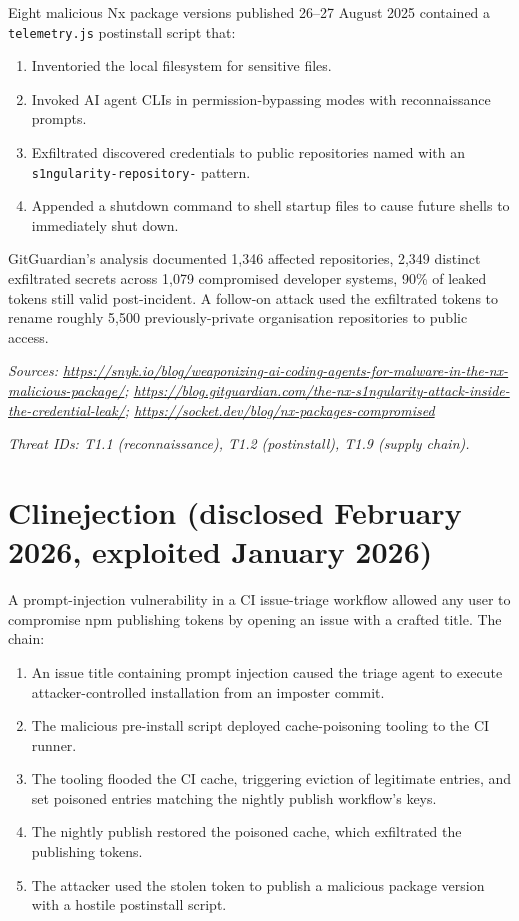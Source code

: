 Eight malicious Nx package versions published 26--27 August 2025
contained a \texttt{telemetry.js} postinstall script that:

\begin{enumerate}
\def\labelenumi{\arabic{enumi}.}
\tightlist
\item
  Inventoried the local filesystem for sensitive files.
\item
  Invoked AI agent CLIs in permission-bypassing modes with
  reconnaissance prompts.
\item
  Exfiltrated discovered credentials to public repositories named with
  an \texttt{s1ngularity-repository-} pattern.
\item
  Appended a shutdown command to shell startup files to cause future
  shells to immediately shut down.
\end{enumerate}

GitGuardian's analysis documented 1,346 affected repositories, 2,349
distinct exfiltrated secrets across 1,079 compromised developer systems,
90\% of leaked tokens still valid post-incident. A follow-on attack used
the exfiltrated tokens to rename roughly 5,500 previously-private
organisation repositories to public access.

\emph{Sources:
\url{https://snyk.io/blog/weaponizing-ai-coding-agents-for-malware-in-the-nx-malicious-package/};
\url{https://blog.gitguardian.com/the-nx-s1ngularity-attack-inside-the-credential-leak/};
\url{https://socket.dev/blog/nx-packages-compromised}}

\emph{Threat IDs: T1.1 (reconnaissance), T1.2 (postinstall), T1.9
(supply chain).}

\hypertarget{clinejection-disclosed-february-2026-exploited-january-2026}{%
\section{Clinejection (disclosed February 2026, exploited January
2026)}\label{clinejection-disclosed-february-2026-exploited-january-2026}}

A prompt-injection vulnerability in a CI issue-triage workflow allowed
any user to compromise npm publishing tokens by opening an issue with a
crafted title. The chain:

\begin{enumerate}
\def\labelenumi{\arabic{enumi}.}
\tightlist
\item
  An issue title containing prompt injection caused the triage agent to
  execute attacker-controlled installation from an imposter commit.
\item
  The malicious pre-install script deployed cache-poisoning tooling to
  the CI runner.
\item
  The tooling flooded the CI cache, triggering eviction of legitimate
  entries, and set poisoned entries matching the nightly publish
  workflow's keys.
\item
  The nightly publish restored the poisoned cache, which exfiltrated the
  publishing tokens.
\item
  The attacker used the stolen token to publish a malicious package
  version with a hostile postinstall script.
\end{enumerate}

